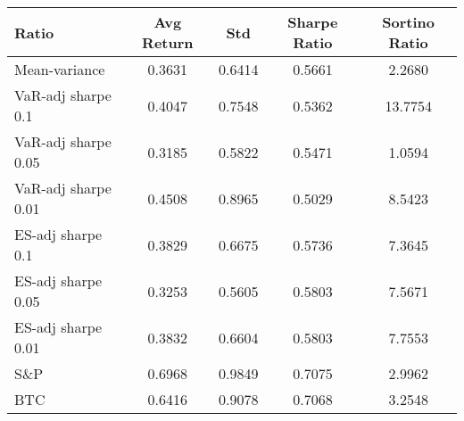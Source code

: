 \begin{tabular}{lcccc}
\toprule
Ratio & Avg Return & Std & Sharpe Ratio & Sortino Ratio\\
\midrule
Mean-variance & 0.3631 & 0.6414 & 0.5661 & 2.2680\\
VaR-adj sharpe 0.1 & 0.4047 & 0.7548 & 0.5362 & 13.7754\\
VaR-adj sharpe 0.05 & 0.3185 & 0.5822 & 0.5471 & 1.0594\\
VaR-adj sharpe 0.01 & 0.4508 & 0.8965 & 0.5029 & 8.5423\\
ES-adj sharpe 0.1 & 0.3829 & 0.6675 & 0.5736 & 7.3645\\
ES-adj sharpe 0.05 & 0.3253 & 0.5605 & 0.5803 & 7.5671\\
ES-adj sharpe 0.01 & 0.3832 & 0.6604 & 0.5803 & 7.7553\\
S\&P & 0.6968 & 0.9849 & 0.7075 & 2.9962\\
BTC & 0.6416 & 0.9078 & 0.7068 & 3.2548\\
\bottomrule
\end{tabular}
